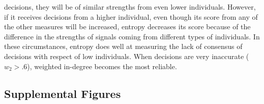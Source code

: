 \documentclass{article}
\begin{document}
decisions, they will be of similar strengths from even lower individuals. However, if it receives decisions from a higher individual, even though its score from any of the other measures will be increased, entropy decreases its score because of the difference in the strengths of signals coming from different types of individuals. In these circumstances, entropy does well at measuring the lack of consensus of decisions with respect of low individuals. When decisions are very inaccurate ($w_2>.6$), weighted in-degree becomes the most reliable.
 




\subsection{Supplemental Figures }

\renewcommand{\thefigure}{S\arabic{figure}}
\setcounter{figure}{0}  
\end{document}
